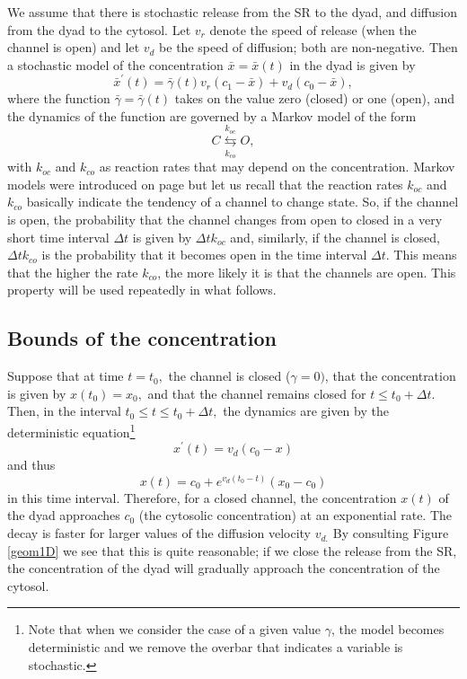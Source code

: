 We assume that there is stochastic release from the SR to the dyad, and diffusion from the dyad to the cytosol. Let $v_{r}$ denote the
speed of release (when the channel is open) and let $v_{d}$ be the speed of diffusion; both are non-negative. Then a stochastic
model of the concentration $\bar{x}=\bar{x}(t)$ in the dyad is given by
\begin{equation}
\bar{x}^{\prime}(t)=\bar{\gamma}(t)v_{r}(c_{1}-\bar{x})+v_{d}(c_{0}-\bar{x}), \label{ode1}
\end{equation}
where the function $\bar{\gamma}=\bar{\gamma}(t)$ takes on the value zero (closed) or one
(open), and the dynamics of the function are governed by a Markov model of the
form
\begin{equation}
C\underset{k_{co}}{\overset{k_{oc}}{\leftrightarrows}}O, \label{Markov}
\end{equation}
with $k_{oc}$ and $k_{co}$ as reaction rates that may depend on the concentration.
Markov models were introduced on page \pageref{markovintro} but let us recall that the 
reaction rates $k_{oc}$ and $k_{co}$ basically indicate the tendency of a channel to change state. So, if 
the channel is open, the probability that the channel changes from open to closed in a very short time interval
$\Delta t$ is given by $\Delta t k_{oc}$ and, similarly, if the channel is closed,
 $\Delta t k_{co}$ is the probability that it becomes open in the time interval $\Delta t$. 
 This means that the higher the rate $k_{co}$,  the more likely it is that the channels are open. This property will be used repeatedly in what follows. 

\subsection{Bounds of the concentration}

Suppose that at time $t=t_{0},$ the channel is closed ($\gamma=0)$, that the
concentration is given by $x(t_0)=x_{0},$ and that the channel remains closed for
$t\leqslant t_{0}+\Delta t.$ Then, in the interval $t_{0}\leqslant t\leqslant
t_{0}+\Delta t,$ the dynamics are given by the deterministic equation\footnote{Note that when we consider the case of a given value
$\gamma$, the model becomes deterministic and we remove the overbar that
indicates a variable is stochastic.}
\[
x^{\prime}(t)=v_{d}(c_{0}-x)
\]
and thus
\[
x(t)=c_{0}+e^{v_{d}(t_{0}-t)}\left(  x_{0}-c_{0}\right)
\]
in this time interval.  Therefore, for a closed channel, the concentration $x(t)$ of the
dyad approaches $c_{0}$ (the cytosolic concentration) at an exponential
rate. The decay is faster for larger values of the diffusion
velocity $v_{d.}$ By consulting Figure \ref{geom1D} we see that this is quite
reasonable; if we close the release from the SR, the concentration of the dyad will gradually approach
the concentration of the cytosol.

